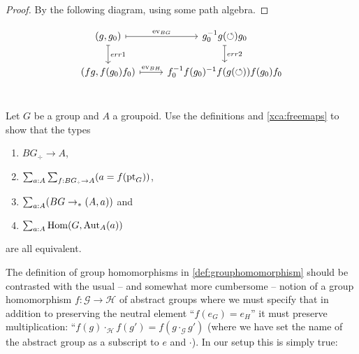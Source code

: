 \begin{proof}
By the following diagram, using some path algebra.
\end{proof}

\[
\begin{tikzcd} 
(g,g_0) \arrow[r, mapsto, "\ev_{BG}"] \arrow[d, mapsto, "err1"] & %
g_0^{-1} g(\Sloop) g_0 \arrow[d, mapsto, "err2"]\\ %
(fg,f(g_0)f_0) \arrow[r, mapsto, "\ev_{BH}"] & f_0^{-1} f(g_0)^{-1} f(g(\Sloop)) f(g_0) f_0 \\
\end{tikzcd}
\]


\begin{xca}\label{xca:BGtotype}
  Let $G$ be a group and $A$ a groupoid.  Use the definitions and
  \cref{xca:freemaps} to show that the types
  \begin{enumerate}
  \item $BG_\div\to A$, 
  \item $\sum_{a:A}\sum_{f:BG_\div \to A}(a=f(\pt_G))$, 
  \item $\sum_{a:A}(BG\to_\ast(A,a))$ and 
  \item $\sum_{a:A}\mathrm{Hom}(G,\mathrm{Aut}_A(a))$
  \end{enumerate}
 are all equivalent.
\end{xca}

The definition of group homomorphisms in \cref{def:grouphomomorphism} should be contrasted with the usual -- and somewhat more cumbersome -- notion of a group homomorphism $f\colon \mathcal G\to \mathcal H$ of abstract groups where we must specify that in addition to preserving the neutral element ``$f(e_G)=e_H$'' it must preserve multiplication: ``$f(g)\cdot_{\mathcal H} f(g')=f(g\cdot_{\mathcal G} g')$ (where we have set the name of the abstract group as a subscript to $e$ and $\cdot$).  In our setup this is simply true:

